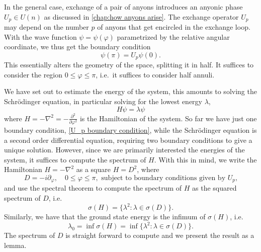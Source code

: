In the general case, exchange of a pair of anyons introduces an anyonic phase $U_p ∈ U(n)$ as discussed in \cref{chap:how anyons arise}. The exchange operator $U_p$ may depend on the number $p$ of anyons that get encircled in the exchange loop. With the wave function $ψ = ψ(\varphi)$ parametrized by the relative angular coordinate, we thus get the boundary condition
\begin{equation}\label{U_p boundary condition}
  ψ(π) = U_p ψ(0).
\end{equation}
This essentially alters the geometry of the space, splitting it in half. It suffices to consider the region $0 \le \varphi \le π$, i.e.\ it suffices to consider half annuli.

We have set out to estimate the energy of the system, this amounts to solving the Schrödinger equation, in particular solving for the lowest energy $λ$,
\begin{equation}
  H ψ = λ ψ
\end{equation}
where $H = -∇^2 = -\frac{\partial^2}{\partial\varphi^2}$ is the Hamiltonian of the system.
So far we have just one boundary condition, \cref{U_p boundary condition}, while the Schrödinger equation is a second order differential equation, requiring two boundary conditions to give a unique solution.
However, since we are primarily interested the energies of the system, it suffices to compute the spectrum of $H$. With this in mind, we write the Hamiltonian $H = -∇^2$ as a square $H = D^2$, where
\begin{equation}
  D = -i\partial_\varphi, \quad 0 \le \varphi \le π, \text{ subject to boundary conditions given by $U_p$,}
\end{equation}
and use the spectral theorem to compute the spectrum of $H$ as the squared spectrum of $D$, i.e.
\begin{equation}
  σ(H) = \{λ^2 : λ ∈ σ(D)\}.
\end{equation}
Similarly, we have that the ground state energy is the infimum of $σ(H)$, i.e.
\begin{equation}
  λ_0 = \inf σ(H) = \inf \{λ^2 : λ ∈ σ(D)\}.
\end{equation}
The spectrum of $D$ is straight forward to compute and we present the result as a lemma.

